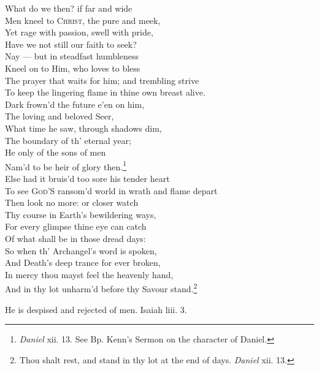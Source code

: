   What do we then? if far and wide \\
 Men kneel to \textsc{Christ}, the pure and meek, \\
 Yet rage with passion, swell with pride, \\
 Have we not still our faith to seek? \\
 Nay — but in steadfast humbleness \\
 Kneel on to Him, who loves to bless \\
 The prayer that waits for him; and trembling strive \\
 To keep the lingering flame in thine own breast alive. \\
  Dark frown’d the future e’en on him, \\
 The loving and beloved Seer, \\
 What time he saw, through shadows dim, \\
 The boundary of th’ eternal year; \\
 He only of the sons of men \\
 Nam’d to be heir of glory then.\footnote{\emph{Daniel} xii. 13. See Bp. Kenn’s Sermon on the character of Daniel.} \\
 Else had it bruis’d too sore his tender heart \\
 To see \textsc{God}’S ransom’d world in wrath and flame depart \\
  Then look no more: or closer watch \\
 Thy course in Earth’s bewildering ways, \\
 For every glimpse thine eye can catch \\
 Of what shall be in those dread days: \\
 So when th’ Archangel’s word is spoken, \\
 And Death’s deep trance for ever broken, \\
 In mercy thou mayst feel the heavenly hand, \\
 And in thy lot unharm’d before thy Savour stand.\footnote{Thou shalt rest, and stand in thy lot at the end of days. \emph{Daniel} xii. 13.}\\


He is despised and rejected of men. Isaiah liii. 3.


